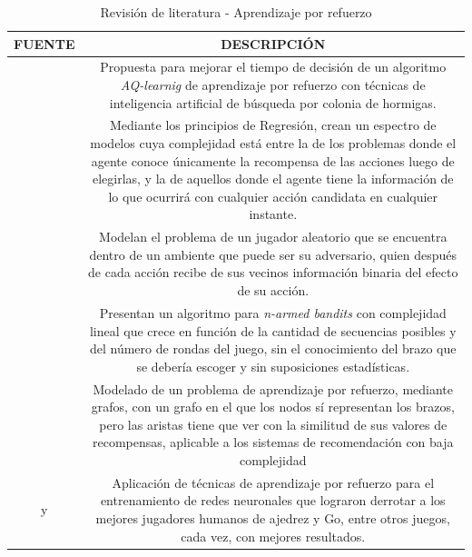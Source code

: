 \begin{table}[H] 
\caption{Revisión de literatura - Aprendizaje por refuerzo}
\centering
\begin{tabular}{cc}
\textbf{FUENTE}   & \textbf{DESCRIPCIÓN}   \\ \hline
\multicolumn{1}{|l|}{\citet{lee2005reinforcement}} & \multicolumn{1}{p{10cm}|}{Propuesta para mejorar el tiempo de decisión de un algoritmo \textit{AQ-learnig} de aprendizaje por refuerzo con técnicas de inteligencia artificial de búsqueda por colonia de hormigas.} \\ \hline
\multicolumn{1}{|l|}{\citet{alon2017nonstochastic}}   & \multicolumn{1}{p{10cm}|}{Mediante los principios de Regresión, crean un espectro de modelos cuya complejidad está entre la de los problemas donde el agente conoce únicamente la recompensa de las acciones luego de elegirlas, y la de aquellos donde el agente tiene la información de lo que ocurrirá con cualquier acción candidata en cualquier instante.} \\ \hline
\multicolumn{1}{|l|}{\citet{alon2015online}}   & \multicolumn{1}{p{10cm}|}{Modelan el problema de un jugador aleatorio que se encuentra dentro de un ambiente que puede ser su adversario, quien después de cada acción recibe de sus vecinos información binaria del efecto de su acción.} \\ \hline
\multicolumn{1}{|l|}{\citet{gokcesu2018online}}   & \multicolumn{1}{p{10cm}|}{Presentan un algoritmo para \textit{n-armed bandits} con complejidad lineal que crece en función de la cantidad de secuencias posibles y del número de rondas del juego, sin el conocimiento del brazo que se debería escoger y sin suposiciones estadísticas.} \\ \hline
\multicolumn{1}{|l|}{\citet{8170860}}   & \multicolumn{1}{p{10cm}|}{Modelado de un problema de aprendizaje por refuerzo, mediante grafos, con un grafo en el que los nodos sí representan los brazos, pero las aristas tiene que ver con la similitud de sus valores de recompensas, aplicable a los sistemas de recomendación con baja complejidad} \\ \hline
\multicolumn{1}{|p{4cm}|}{\citet{silver2017mastering} y \citet{silver2016mastering}}   & \multicolumn{1}{p{10cm}|}{Aplicación de técnicas de aprendizaje por refuerzo para el entrenamiento de redes neuronales que lograron derrotar a los mejores jugadores humanos de ajedrez y Go, entre otros juegos, cada vez, con mejores resultados.} \\ \hline
\end{tabular}
\label{tab:litera}
\end{table}

